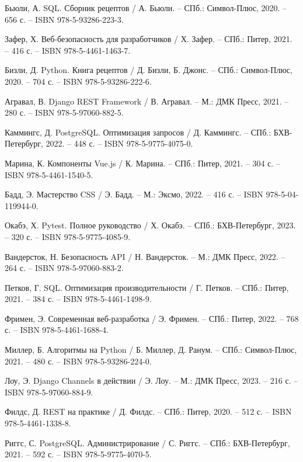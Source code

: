 \begin{thebibliography}{9}
	 Бьюли, А. SQL. Сборник рецептов / А. Бьюли. – СПб.: Символ-Плюс, 2020. – 656 с. – ISBN 978-5-93286-223-3.
	
	 Зафер, Х. Веб-безопасность для разработчиков / Х. Зафер. – СПб.: Питер, 2021. – 416 с. – ISBN 978-5-4461-1463-7.
	
	 Бизли, Д. Python. Книга рецептов / Д. Бизли, Б. Джонс. – СПб.: Символ-Плюс, 2020. – 704 с. – ISBN 978-5-93286-222-6.
	
	 Агравал, В. Django REST Framework / В. Агравал. – М.: ДМК Пресс, 2021. – 280 с. – ISBN 978-5-97060-882-5.
	
	 Каммингс, Д. PostgreSQL. Оптимизация запросов / Д. Каммингс. – СПб.: БХВ-Петербург, 2022. – 448 с. – ISBN 978-5-9775-4075-0.
	
	 Марина, К. Компоненты Vue.js / К. Марина. – СПб.: Питер, 2021. – 304 с. – ISBN 978-5-4461-1540-5.
	
	 Бадд, Э. Мастерство CSS / Э. Бадд. – М.: Эксмо, 2022. – 416 с. – ISBN 978-5-04-119944-0.
	
	 Окабэ, Х. Pytest. Полное руководство / Х. Окабэ. – СПб.: БХВ-Петербург, 2023. – 320 с. – ISBN 978-5-9775-4085-9.
	
	 Вандерсток, Н. Безопасность API / Н. Вандерсток. – М.: ДМК Пресс, 2022. – 264 с. – ISBN 978-5-97060-883-2.
	
	 Петков, Г. SQL. Оптимизация производительности / Г. Петков. – СПб.: Питер, 2021. – 384 с. – ISBN 978-5-4461-1498-9.
	
	 Фримен, Э. Современная веб-разработка / Э. Фримен. – СПб.: Питер, 2022. – 768 с. – ISBN 978-5-4461-1688-4.
	
	 Миллер, Б. Алгоритмы на Python / Б. Миллер, Д. Ранум. – СПб.: Символ-Плюс, 2021. – 480 с. – ISBN 978-5-93286-224-0.
	
	 Лоу, Э. Django Channels в действии / Э. Лоу. – М.: ДМК Пресс, 2023. – 216 с. – ISBN 978-5-97060-884-9.
	
	 Филдс, Д. REST на практике / Д. Филдс. – СПб.: Питер, 2020. – 512 с. – ISBN 978-5-4461-1338-8.
	
	 Риггс, С. PostgreSQL. Администрирование / С. Риггс. – СПб.: БХВ-Петербург, 2021. – 592 с. – ISBN 978-5-9775-4070-5.
	

\end{thebibliography}
